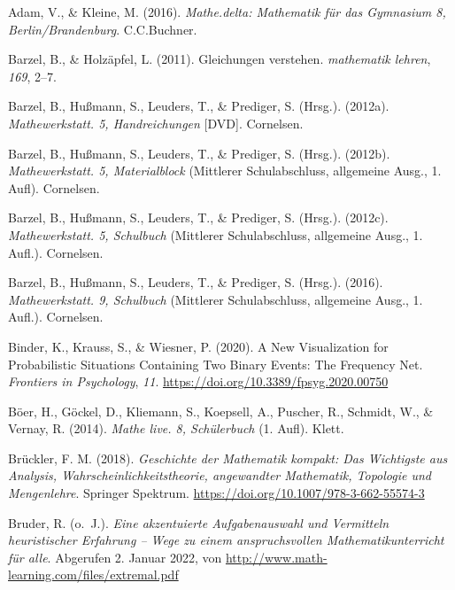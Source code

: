 \documentclass[
]{scrbook}
\newlength{\cslhangindent}
\newlength{\cslentryspacingunit} %
\newenvironment{CSLReferences}[2] %
 {%
  \setlength{\parindent}{0pt}
  \ifodd #1
  \let\oldpar\par
  \def\par{\hangindent=\cslhangindent\oldpar}
  \fi
  \setlength{\parskip}{#2\cslentryspacingunit}
 }%
 {}
\theoremstyle{definition}
\theoremstyle{definition}
\theoremstyle{definition}
\theoremstyle{definition}
\theoremstyle{remark}
\begin{document}
\hypertarget{refs}{}
\begin{CSLReferences}{1}{0}
\leavevmode{}%
Adam, V., \& Kleine, M. (2016). \emph{Mathe.delta: {Mathematik} für das {Gymnasium} 8, {Berlin}/{Brandenburg}}. C.C.Buchner.

\leavevmode{}%
Barzel, B., \& Holzäpfel, L. (2011). Gleichungen verstehen. \emph{mathematik lehren}, \emph{169}, 2--7.

\leavevmode{}%
Barzel, B., Hußmann, S., Leuders, T., \& Prediger, S. (Hrsg.). (2012a). \emph{Mathewerkstatt. 5, {Handreichungen}} {[}DVD{]}. Cornelsen.

\leavevmode{}%
Barzel, B., Hußmann, S., Leuders, T., \& Prediger, S. (Hrsg.). (2012b). \emph{Mathewerkstatt. 5, {Materialblock}} (Mittlerer Schulabschluss, allgemeine Ausg., 1. Aufl). Cornelsen.

\leavevmode{}%
Barzel, B., Hußmann, S., Leuders, T., \& Prediger, S. (Hrsg.). (2012c). \emph{Mathewerkstatt. 5, {Schulbuch}} (Mittlerer Schulabschluss, allgemeine Ausg., 1. Aufl.). Cornelsen.

\leavevmode{}%
Barzel, B., Hußmann, S., Leuders, T., \& Prediger, S. (Hrsg.). (2016). \emph{Mathewerkstatt. 9, {Schulbuch}} (Mittlerer Schulabschluss, allgemeine Ausg., 1. Aufl.). Cornelsen.

\leavevmode{}%
Binder, K., Krauss, S., \& Wiesner, P. (2020). A {New} {Visualization} for {Probabilistic} {Situations} {Containing} {Two} {Binary} {Events}: {The} {Frequency} {Net}. \emph{Frontiers in Psychology}, \emph{11}. \url{https://doi.org/10.3389/fpsyg.2020.00750}

\leavevmode{}%
Böer, H., Göckel, D., Kliemann, S., Koepsell, A., Puscher, R., Schmidt, W., \& Vernay, R. (2014). \emph{Mathe live. 8, {Schülerbuch}} (1. Aufl). Klett.

\leavevmode{}%
Brückler, F. M. (2018). \emph{Geschichte der {Mathematik} kompakt: {Das} {Wichtigste} aus {Analysis}, {Wahrscheinlichkeitstheorie}, angewandter {Mathematik}, {Topologie} und {Mengenlehre}}. Springer Spektrum. \url{https://doi.org/10.1007/978-3-662-55574-3}

\leavevmode{}%
Bruder, R. (o.~J.). \emph{Eine akzentuierte {Aufgabenauswahl} und {Vermitteln} heuristischer {Erfahrung} -- {Wege} zu einem anspruchsvollen {Mathematikunterricht} für alle}. Abgerufen 2. Januar 2022, von \url{http://www.math-learning.com/files/extremal.pdf}


\end{CSLReferences}
\end{document}
